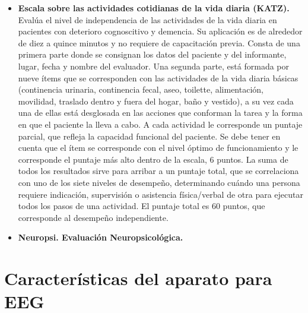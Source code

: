\begin{itemize}
\item \textbf{Escala sobre las actividades cotidianas de la vida diaria (KATZ).} Eval\'ua el nivel
de independencia de las actividades de la vida diaria en pacientes con deterioro cognoscitivo y 
demencia. Su aplicaci\'on es de alrededor de diez a quince minutos y no requiere de capacitaci\'on 
previa. Consta de una primera parte donde se consignan los datos del paciente y del informante, 
lugar, fecha y nombre del evaluador. Una segunda parte, est\'a formada por nueve \'items que se 
corresponden con las actividades de la vida diaria b\'asicas (continencia urinaria, continencia 
fecal, aseo, toilette, alimentaci\'on, movilidad, traslado dentro y fuera del hogar, ba\~no y 
vestido), a su vez cada una de ellas est\'a desglosada en las acciones que conforman la tarea y la 
forma en que el paciente la lleva a cabo. A cada actividad le corresponde un puntaje parcial, que 
refleja la capacidad funcional del paciente. Se debe tener en cuenta que el \'item se corresponde 
con el nivel \'optimo de funcionamiento y le corresponde el puntaje m\'as alto dentro de la escala,
6 puntos. La suma de todos los resultados sirve para arribar a un puntaje total, que se 
correlaciona con uno de los siete niveles de desempe\~no, determinando cu\'ando una persona 
requiere indicaci\'on, supervisi\'on o asistencia f\'isica/verbal de otra para ejecutar todos los 
pasos de una actividad. El puntaje total es 60 puntos, que corresponde al desempe\~no 
independiente.\cite{Roumec14}

\item \textbf{Neuropsi. Evaluaci\'on Neuropsicol\'ogica.} 

\end{itemize}


\section{Caracter\'isticas del aparato para EEG}

